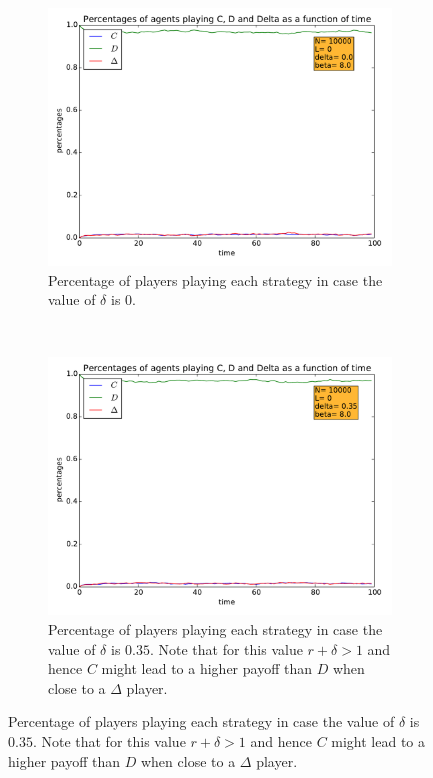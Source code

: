 \documentclass{article}
\begin{document}
\begin{figure}[htbp] 
\centering
\begin{subfigure}[t]{0.47\textwidth}
  \centering
  \includegraphics[width=\textwidth]{./Figures/IM2_nodelta}
  \caption{Percentage of players playing each strategy in case the value of $\delta$ is 0.}
  \label{fig:IM2_nodelta} 
\end{subfigure}%
~
~
\begin{subfigure}[t]{0.47\textwidth}
  \centering
  \includegraphics[width=\textwidth]{./Figures/IM2_delta}
  \caption{Percentage of players playing each strategy in case the value of $\delta$ is $0.35$. Note that for this value $r+\delta >1$ and hence $C$ might lead to a higher payoff than $D$ when close to a $\Delta$ player.}

\end{subfigure}
\end{figure}
\end{document}
